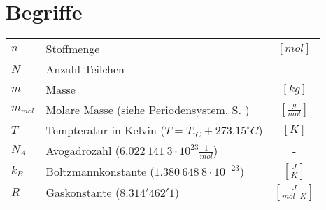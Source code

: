 \section{Begriffe}
\begin{table}[h!]
\renewcommand{\arraystretch}{1.5}
\begin{tabular}{p{} l c}
$n$		
	& Stoffmenge 		
	& $[mol]$ \\
$N$		
	& Anzahl Teilchen 	
	& - \\
$m$		
	& Masse 		
	& $[kg]$ \\
$m_{mol}$	
	& Molare Masse (siehe Periodensystem, S. \pageref{fig:persys})	
	& $\left[\frac{g}{mol}\right]$ \\
$T$		
	& Tempteratur in Kelvin  ($T = T_{^\circ C} + 273.15 ^\circ C$) 
	& $[K]$ \\
$N_A$	
	& Avogadrozahl ($6.022~141~3 \cdot 10^{23} \frac{1}{mol}$) 
	& - \\
$k_B$		
	& Boltzmannkonstante ($1.380~648~8 \cdot 10^{-23}$)
	& $\left[\frac{J}{K}\right]$ \\ 
$R$	
	& Gaskonstante ($8.314'462'1$)
	& $\left[\frac{J}{mol \cdot K}\right]$
\end{tabular}
\end{table}
